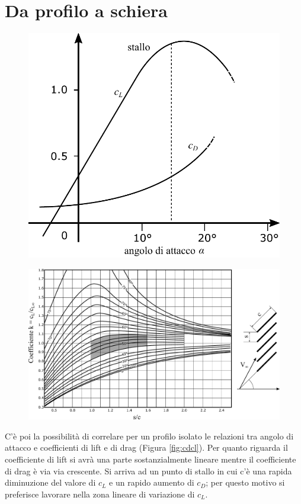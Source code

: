 \section{Da profilo a schiera} 
\begin{figure}
\centering
\begin{minipage}{.3\textwidth}
  \centering
  \includegraphics[width=.95\linewidth]{fig/cdcl.pdf}
  \label{fig:cdcl}
\end{minipage}%
\begin{minipage}{.7\textwidth}
  \centering
  \includegraphics[width=.95\linewidth]{fig/EffSchiera.pdf}
  \label{fig:EffSchiera}
\end{minipage}
\end{figure}
C'è poi la possibilità di correlare per un profilo isolato le relazioni tra angolo di attacco e coefficienti di lift e di drag (Figura \ref{fig:cdcl}). Per quanto riguarda il coefficiente di lift si avrà una parte sostanzialmente lineare mentre il coefficiente di drag è via via crescente. Si arriva ad un punto di stallo in cui c'è una rapida diminuzione del valore di $c_L$ e un rapido aumento di $c_D$; per questo motivo si preferisce lavorare nella zona lineare di variazione di $c_L$.

